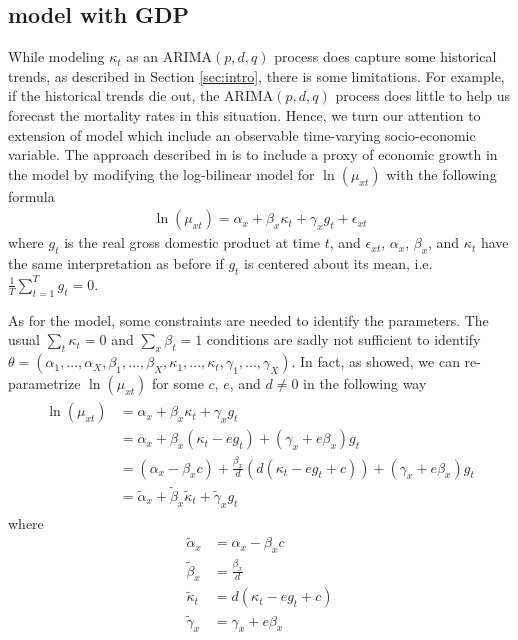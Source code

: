 \documentclass[AER, draftmode]{AEA}
\begin{document}
\subsection{\cite{Lee1992} model with GDP \citep{Niu2014}}

While modeling $\kappa_t$ as an ARIMA$(p,d,q)$ process does capture some historical trends, as described in Section \ref{sec:intro}, there is some limitations. For example, if the historical trends die out, the ARIMA$(p,d,q)$ process does little to help us forecast the mortality rates in this situation. Hence, we turn our attention to \cite{Niu2014} extension of \cite{Lee1992} model which include an observable time-varying socio-economic variable. The approach described in \cite{Niu2014} is to include a proxy of economic growth in the \cite{Lee1992} model by modifying the log-bilinear model for $\ln(\mu_{xt})$ with the following formula
\begin{align}
\ln(\mu_{xt})=\alpha_x+\beta_x \kappa_t + \gamma_x g_t + \epsilon_{xt}
\end{align} 
where $g_t$ is the real gross domestic product at time $t$, and $\epsilon_{xt}$, $\alpha_x$, $\beta_x$, and $\kappa_t$ have the same interpretation as before if $g_t$ is centered about its mean, i.e. $\frac{1}{T}\sum_{t=1}^T g_t = 0$.

As for the \cite{Lee1992} model, some constraints are needed to identify the parameters. The usual $\sum_t \kappa_t = 0$ and $\sum_x \beta_t = 1$ conditions are sadly not sufficient to identify $\theta = (\alpha_1, ..., \alpha_X, \beta_1, ..., \beta_X, \kappa_1, ..., \kappa_t, \gamma_1,..., \gamma_X)$. In fact, as \cite{Niu2014} showed, we can re-parametrize  $\ln(\mu_{xt})$ for some $c$, $e$, and $d\neq 0$ in the following way
\begin{align}\label{eq:par_1}
\begin{split}
	\ln(\mu_{xt}) &= \alpha_x+\beta_x \kappa_t + \gamma_x g_t \\
	&= \alpha_x+\beta_x (\kappa_t - eg_t)+ (\gamma_x + e\beta_x) g_t \\
	&= (\alpha_x-\beta_xc)+\frac{\beta_x}{d} (d(\kappa_t - eg_t+c))+ (\gamma_x + e\beta_x) g_t \\
	&= \tilde{\alpha}_x+\tilde{\beta}_x \tilde{\kappa}_t + \tilde{\gamma}_x g_t
\end{split}
\end{align}
where
\begin{align}
\tilde{\alpha}_x &= \alpha_x - \beta_x c\\
\tilde{\beta}_x &= \frac{\beta_x}{d} \\
\tilde{\kappa}_t &= d(\kappa_t - eg_t+c)\\
\tilde{\gamma}_x &= \gamma_x + e\beta_x
\end{align}
\end{document}
